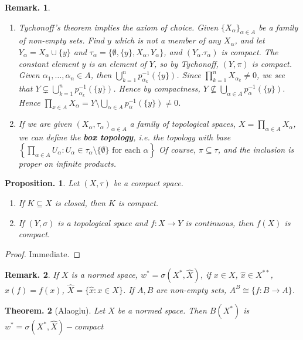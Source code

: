 \documentclass[11pt, a4paper]{memoir}
\theoremstyle{change}
\newtheorem{theorem}{Theorem.}[section]
\newtheorem{proposition}[theorem]{Proposition.}
\theoremstyle{plain}
\theoremstyle{nonumberplain}
\newtheorem{remark}{Remark.}
\newtheorem{proof}{Proof}
\numberwithin{equation}{section}
\begin{document}
\begin{remark}
    \begin{enumerate}[r]
        \item Tychonoff's theorem implies the axiom of choice.
            Given $\{X_\alpha\}_{\alpha\in A}$ be a family of non-empty sets.
            Find $y$ which is not a member of any $X_\alpha$, and let $Y_\alpha=X_\alpha\cup\{y\}$ and $\tau_\alpha=\{\emptyset,\{y\},X_\alpha,Y_\alpha\}$, and $(Y_\alpha.\tau_\alpha)$ is compact.
            The constant element $y$ is an element of $Y$, so by Tychonoff, $(Y,\pi)$ is compact.
            Given $\alpha_1,\ldots,\alpha_n\in A$, then $\bigcup_{k=1}^np_{\alpha_k}^{-1}(\{y\})$.
            Since $\prod_{k=1}^n X_{\alpha_k}\neq 0$, we see that $Y\subsetneq\bigcup_{k=1}^np_{\alpha_k}^{-1}(\{y\})$.
            Hence by compactness, $Y\not\subseteq\bigcup_{\alpha\in A}p_\alpha^{-1}(\{y\})$.
            Hence $\prod_{x\in A}X_\alpha=Y\setminus\bigcup_{\alpha\in A}p_\alpha^{-1}(\{y\})\neq 0$.
        \item If we are given $(X_\alpha,\tau_\alpha)_{\alpha\in A}$ a family of topological spaces, $X=\prod_{\alpha\in A}X_\alpha$, we can define the \textbf{box topology}, i.e. the topology with base $\left\{\prod_{\alpha\in A}U_\alpha:U_\alpha\in\tau_\alpha\setminus\{\emptyset\}\text{ for each }\alpha\right\}$
            Of course, $\pi\subseteq\tau$, and the inclusion is proper on infinite products.
    \end{enumerate}
\end{remark}
\begin{proposition}
    Let $(X,\tau)$ be a compact space.
    \begin{enumerate}[nl,r]
        \item If $K\subseteq X$ is closed, then $K$ is compact.
        \item If $(Y,\sigma)$ is a topological space and $f:X\to Y$ is continuous, then $f(X)$ is compact.
    \end{enumerate}
\end{proposition}
\begin{proof}
    Immediate.
\end{proof}
\begin{remark}
    If $X$ is a normed space, $w^*=\sigma(X^*,\hat X)$, if $x\in X$, $\hat x\in X^{**}$, $\hat x(f)=f(x)$, $\hat X=\{\hat x:x\in X\}$.
    If $A,B$ are non-empty sets, $A^B\cong \{f:B\to A\}$.
\end{remark}
\begin{theorem}[Alaoglu]
    Let $X$ be a normed space.
    Then $B(X^*)$ is $w^*=\sigma(X^*,\hat X)-$compact
\end{theorem}
\end{document}
